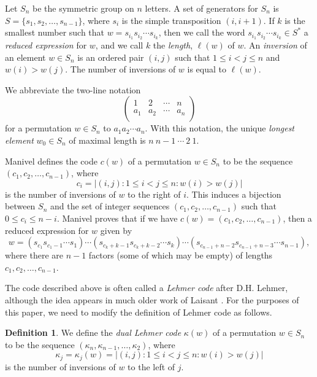 \documentclass{amsart}
\theoremstyle{plain}
\theoremstyle{definition}
\newtheorem{defn}[theorem]{Definition}
\theoremstyle{remark}
\numberwithin{equation}{section}
\newcommand{\leh}{\kappa}
\begin{document}
Let $S_n$ be the symmetric group on $n$ letters. A set of generators for $S_n$ is $S = \{s_1, s_2, \ldots, s_{n-1}\}$,
where $s_i$ is the simple transposition $(i, i+1)$. If $k$ is the smallest number such that 
$w = s_{i_1} s_{i_2} \cdots s_{i_k}$, then we call the word $s_{i_1} s_{i_2} \cdots s_{i_k} \in S^*$ a {\it reduced
expression} for $w$, and we call $k$ the {\it length}, $\ell(w)$ of $w$. An {\it inversion} of an element $w \in S_n$ 
is an ordered pair $(i, j)$ such that $1 \leq i < j \leq n$ and $w(i) > w(j)$. The number of inversions of $w$ is equal 
to $\ell(w)$.

We abbreviate the two-line notation $$
\left(
\begin{matrix}
1 & 2 & \cdots & n\\
a_1 & a_2 & \cdots & a_n\\
\end{matrix}
\right)
$$ for a permutation $w \in S_n$ to $a_1 a_2 \cdots a_n$. With this notation, the unique {\it longest element} 
$w_0 \in S_n$ of maximal length is $n\  n-1\ \cdots\ 2 \ 1$.

Manivel \cite[\S2.1]{manivel01} defines the code $c(w)$ of a permutation $w \in S_n$ to be the sequence 
$(c_1, c_2, \ldots, c_{n-1})$, where $$
c_i = \left| (i, j) : 1 \leq i < j \leq n : w(i) > w(j) \right| 
$$ is the number of inversions of $w$ to the right of $i$. This induces a bijection between $S_n$ and the set of
integer sequences $(c_1, c_2, \ldots, c_{n-1})$ such that $0 \leq c_i \leq n-i$.
Manivel \cite[Remark 2.1.9]{manivel01} proves that if we have $c(w) = (c_1, c_2, \ldots, c_{n-1})$, then a reduced
expression for $w$ given by $$
w = 
(s_{c_1} s_{c_1 - 1} \cdots s_1)
\cdots 
(s_{c_k + k - 1} s_{c_k + k - 2} \cdots s_k)
\cdots
(s_{c_{n-1} + n - 2} s_{c_{n-1} + n - 3} \cdots s_{n-1})
,$$ where there are $n-1$ factors (some of which may be empty) of lengths $c_1, c_2, \ldots, c_{n-1}$.

The code described above is often called a {\it Lehmer code} after D.H. Lehmer, although the idea appears in much
older work of Laisant \cite{laisant1888}. For the purposes of this paper, we need to modify the definition of Lehmer
code as follows.

\begin{defn}\label{def:lehmer}
We define the {\it dual Lehmer code} $\leh(w)$ of a permutation $w \in S_n$ to be the sequence 
$(\leh_n, \leh_{n-1}, \ldots, \leh_2)$, where $$
\leh_j = \leh_j(w) = \left| (i, j) : 1 \leq i < j \leq n : w(i) > w(j) \right| 
$$ is the number of inversions of $w$ to the left of $j$.
\end{defn}
\end{document}
